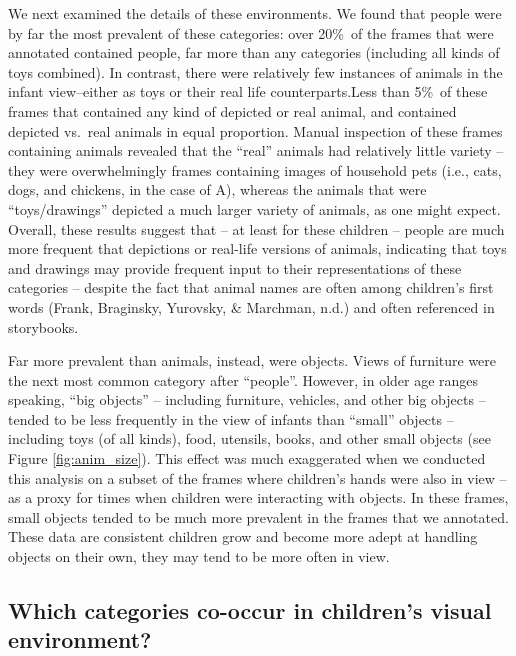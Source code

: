 \documentclass[10pt, letterpaper]{article}
\begin{document}
We next examined the details of these environments. We found that people
were by far the most prevalent of these categories: over 20\%~of the
frames that were annotated contained people, far more than any
categories (including all kinds of toys combined). In contrast, there
were relatively few instances of animals in the infant view--either as
toys or their real life counterparts.Less than 5\%~of these frames that
contained any kind of depicted or real animal, and contained depicted
vs.~real animals in equal proportion. Manual inspection of these frames
containing animals revealed that the ``real'' animals had relatively
little variety -- they were overwhelmingly frames containing images of
household pets (i.e., cats, dogs, and chickens, in the case of A),
whereas the animals that were ``toys/drawings'' depicted a much larger
variety of animals, as one might expect. Overall, these results suggest
that -- at least for these children -- people are much more frequent
that depictions or real-life versions of animals, indicating that toys
and drawings may provide frequent input to their representations of
these categories -- despite the fact that animal names are often among
children's first words (Frank, Braginsky, Yurovsky, \& Marchman, n.d.)
and often referenced in storybooks.

Far more prevalent than animals, instead, were objects. Views of
furniture were the next most common category after ``people''. However,
in older age ranges speaking, ``big objects'' -- including furniture,
vehicles, and other big objects -- tended to be less frequently in the
view of infants than ``small'' objects -- including toys (of all kinds),
food, utensils, books, and other small objects (see Figure
\ref{fig:anim_size}). This effect was much exaggerated when we conducted
this analysis on a subset of the frames where children's hands were also
in view -- as a proxy for times when children were interacting with
objects. In these frames, small objects tended to be much more prevalent
in the frames that we annotated. These data are consistent children grow
and become more adept at handling objects on their own, they may tend to
be more often in view.

\hypertarget{which-categories-co-occur-in-childrens-visual-environment}{%
\subsection{Which categories co-occur in children's visual
environment?}\label{which-categories-co-occur-in-childrens-visual-environment}}
\end{document}
